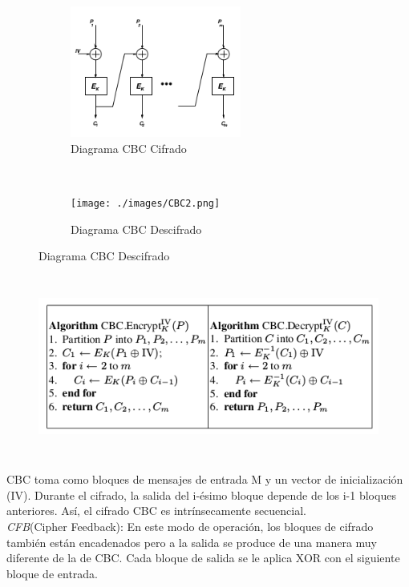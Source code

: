 \begin{figure}[h]
    \centering
    \begin{subfigure}[t]{0.5\textwidth}
        \centering
        \includegraphics[height=1.7in]{./images/cbc1.png}
        \caption{Diagrama CBC Cifrado}
        \label{fig:1-4-1}
    \end{subfigure}%
    ~ 
    \begin{subfigure}[t]{0.5\textwidth}
        \centering
        \texttt{[image: ./images/CBC2.png]}
        \caption{Diagrama CBC Descifrado}
        \label{fig:1-4-1}
    \end{subfigure}
    \label{fig:protocol}
\end{figure}

 \begin{figure}[H]
 \centering
	\includegraphics[width=14cm, height=6cm]{./images/pcbc.png}
	
\end{figure}

CBC toma como bloques de mensajes de entrada M y un vector de inicialización (IV). Durante el cifrado, la salida del i-ésimo bloque depende de los i-1 bloques anteriores. Así, el cifrado CBC es intrínsecamente secuencial.\\

\textit{CFB}(Cipher Feedback): En este modo de operación, los bloques de cifrado también están encadenados pero a la salida se produce de una manera muy diferente de la de CBC. Cada bloque de salida se le aplica XOR con el siguiente bloque de entrada.\\

